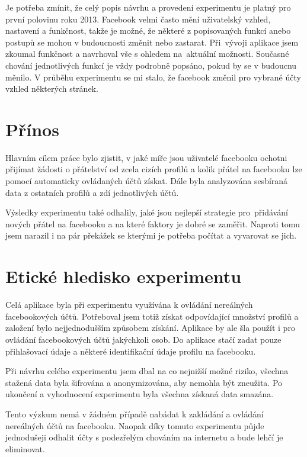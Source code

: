 \documentclass[thesis=M,czech]{FITthesis}[2013/05/10]
\begin{document}
Je potřeba zmínit, že celý popis návrhu a provedení experimentu je platný pro první polovinu roku 2013. Facebook velmi často mění uživatelský vzhled, nastavení a funkčnost, takže je možné, že některé z popisovaných funkcí anebo postupů se mohou v budoucnosti změnit nebo zastarat. Při~vývoji aplikace jsem zkoumal funkčnost a navrhoval vše s ohledem na~aktuální možnosti. Současné chování jednotlivých funkcí je vždy podrobně popsáno, pokud by se v budoucnu měnilo. V průběhu experimentu se mi stalo, že facebook změnil pro vybrané účty vzhled některých stránek. 

\section{Přínos}

Hlavním cílem práce bylo zjistit, v jaké míře jsou uživatelé facebooku ochotni přijímat žádosti o přátelství od zcela cizích profilů a kolik přátel na facebooku lze pomocí automaticky ovládaných účtů získat. Dále byla analyzována sesbíraná data z ostatních profilů a zdí jednotlivých účtů.

Výsledky experimentu také odhalily, jaké jsou nejlepší strategie pro~přidávání nových přátel na facebooku a na které faktory je dobré se zaměřit. Naproti tomu jsem narazil i na pár překážek se kterými je potřeba počítat a vyvarovat se jich.

\section{Etické hledisko experimentu}

Celá aplikace byla při experimentu využívána k ovládání nereálných facebookových účtů. Potřeboval jsem totiž získat odpovídající množství profilů a založení bylo nejjednodušším způsobem získání. Aplikace by ale šla použít i pro ovládání facebookových účtů jakýchkoli osob. Do aplikace stačí zadat pouze přihlašovací údaje a některé identifikační údaje profilu na facebooku.

Při návrhu celého experimentu jsem dbal na co nejnižší možné riziko, všechna stažená data byla šifrována a anonymizována, aby nemohla být zneužita. Po ukončení a vyhodnocení experimentu byla všechna získaná data smazána. 

Tento výzkum nemá v žádném případě nabádat k zakládání a ovládání nereálných účtů na facebooku. Naopak díky tomuto experimentu půjde jednodušeji odhalit účty s podezřelým chováním na internetu a bude lehčí je eliminovat.
\end{document}
